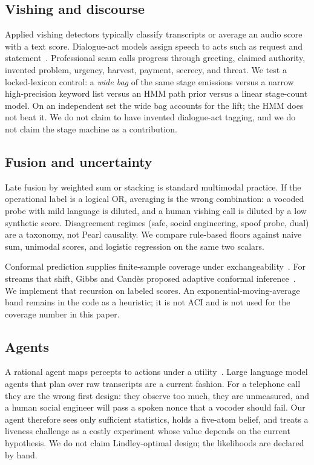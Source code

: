 \documentclass[11pt]{article}
\begin{document}
\subsection{Vishing and discourse}
Applied vishing detectors typically classify transcripts or average an audio score with a text score. Dialogue-act models assign speech to acts such as request and statement~\cite{stolcke2000dialogue}. Professional scam calls progress through greeting, claimed authority, invented problem, urgency, harvest, payment, secrecy, and threat. We test a locked-lexicon control: a \emph{wide bag} of the same stage emissions versus a narrow high-precision keyword list versus an HMM path prior versus a linear stage-count model. On an independent set the wide bag accounts for the lift; the HMM does not beat it. We do not claim to have invented dialogue-act tagging, and we do not claim the stage machine as a contribution.

\subsection{Fusion and uncertainty}
Late fusion by weighted sum or stacking is standard multimodal practice. If the operational label is a logical OR, averaging is the wrong combination: a vocoded probe with mild language is diluted, and a human vishing call is diluted by a low synthetic score. Disagreement regimes (safe, social engineering, spoof probe, dual) are a taxonomy, not Pearl causality. We compare rule-based floors against naive sum, unimodal scores, and logistic regression on the same two scalars.

Conformal prediction supplies finite-sample coverage under exchangeability~\cite{angelopoulos2023gentle}. For streams that shift, Gibbs and Cand\`es proposed adaptive conformal inference~\cite{gibbs2021aci}. We implement that recursion on labeled scores. An exponential-moving-average band remains in the code as a heuristic; it is not ACI and is not used for the coverage number in this paper.

\subsection{Agents}
A rational agent maps percepts to actions under a utility~\cite{russell2010aima}. Large language model agents that plan over raw transcripts are a current fashion. For a telephone call they are the wrong first design: they observe too much, they are unmeasured, and a human social engineer will pass a spoken nonce that a vocoder should fail. Our agent therefore sees only sufficient statistics, holds a five-atom belief, and treats a liveness challenge as a costly experiment whose value depends on the current hypothesis. We do not claim Lindley-optimal design; the likelihoods are declared by hand.
\end{document}
